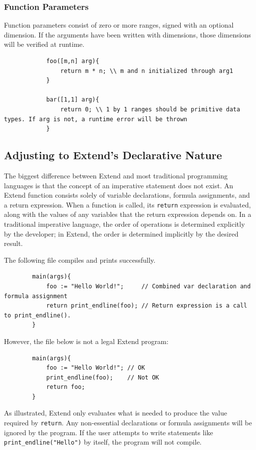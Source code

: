 		\subsubsection{Function Parameters}
		Function parameters consist of zero or more ranges, signed with an optional dimension. If the arguments have been written with dimensions, those dimensions will be verified at runtime.
		\begin{lstlisting}
			foo([m,n] arg){
				return m * n; \\ m and n initialized through arg1
			}

			bar([1,1] arg){
				return 0; \\ 1 by 1 ranges should be primitive data types. If arg is not, a runtime error will be thrown
			}
		\end{lstlisting}

	\subsection{Adjusting to Extend's Declarative Nature}
	The biggest difference between Extend and most traditional programming languages is that the concept of an imperative statement does not exist. An Extend function consists solely of variable declarations, formula assignments, and a return expression. When a function is called, its \texttt{return} expression is evaluated, along with the values of any variables that the return expression depends on. In a traditional imperative language, the order of operations is determined explicitly by the developer; in Extend, the order is determined implicitly by the desired result.

	\medskip \noindent The following file compiles and prints successfully.

	\begin{lstlisting}
		main(args){
			foo := "Hello World!";     // Combined var declaration and formula assignment
			return print_endline(foo); // Return expression is a call to print_endline().
		}
	\end{lstlisting}

	\medskip \noindent However, the file below is not a legal Extend program:

	\begin{lstlisting}
		main(args){
			foo := "Hello World!"; // OK
			print_endline(foo);    // Not OK
			return foo;
		}
	\end{lstlisting}

	\medskip \noindent As illustrated, Extend only evaluates what is needed to produce the value required by \texttt{return}. Any non-essential declarations or formula assignments will be ignored by the program. If the user attempts to write statements like \texttt{print\_endline("Hello")} by itself, the program will not compile.

